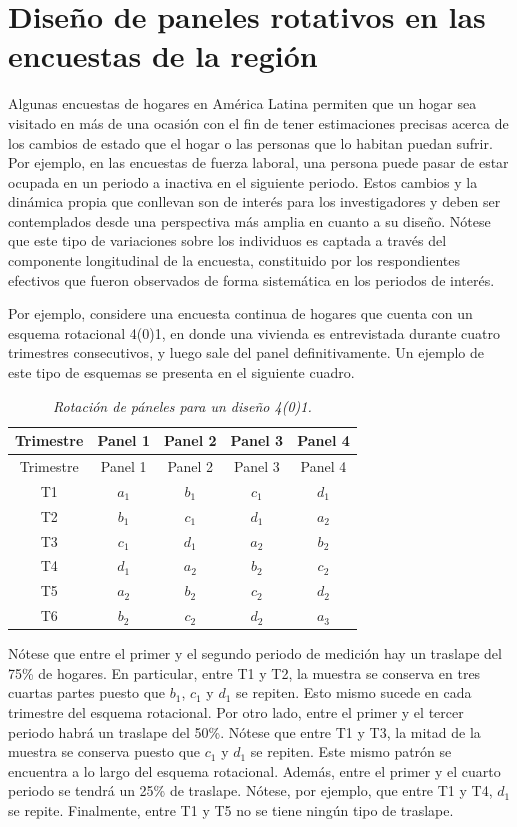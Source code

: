 \documentclass[
  12pt,
  spanish,
]{book}
\begin{document}
\hypertarget{diseuxf1o-de-paneles-rotativos-en-las-encuestas-de-la-regiuxf3n}{%
\section{Diseño de paneles rotativos en las encuestas de la región}\label{diseuxf1o-de-paneles-rotativos-en-las-encuestas-de-la-regiuxf3n}}

Algunas encuestas de hogares en América Latina permiten que un hogar sea visitado en más de una ocasión con el fin de tener estimaciones precisas acerca de los cambios de estado que el hogar o las personas que lo habitan puedan sufrir. Por ejemplo, en las encuestas de fuerza laboral, una persona puede pasar de estar ocupada en un periodo a inactiva en el siguiente periodo. Estos cambios y la dinámica propia que conllevan son de interés para los investigadores y deben ser contemplados desde una perspectiva más amplia en cuanto a su diseño. Nótese que este tipo de variaciones sobre los individuos es captada a través del componente longitudinal de la encuesta, constituido por los respondientes efectivos que fueron observados de forma sistemática en los periodos de interés.

Por ejemplo, considere una encuesta continua de hogares que cuenta con un esquema rotacional 4(0)1, en donde una vivienda es entrevistada durante cuatro trimestres consecutivos, y luego sale del panel definitivamente. Un ejemplo de este tipo de esquemas se presenta en el siguiente cuadro.

\begin{longtable}[]{@{}ccccc@{}}
\caption{\emph{Rotación de páneles para un diseño 4(0)1.}}\tabularnewline
\toprule
Trimestre & Panel 1 & Panel 2 & Panel 3 & Panel 4 \\
\midrule
\endfirsthead
\toprule
Trimestre & Panel 1 & Panel 2 & Panel 3 & Panel 4 \\
\midrule
\endhead
T1 & \(a_1\) & \(b_1\) & \(c_1\) & \(d_1\) \\
T2 & \(b_1\) & \(c_1\) & \(d_1\) & \(a_2\) \\
T3 & \(c_1\) & \(d_1\) & \(a_2\) & \(b_2\) \\
T4 & \(d_1\) & \(a_2\) & \(b_2\) & \(c_2\) \\
T5 & \(a_2\) & \(b_2\) & \(c_2\) & \(d_2\) \\
T6 & \(b_2\) & \(c_2\) & \(d_2\) & \(a_3\) \\
\bottomrule
\end{longtable}

Nótese que entre el primer y el segundo periodo de medición hay un traslape del 75\% de hogares. En particular, entre T1 y T2, la muestra se conserva en tres cuartas partes puesto que \(b_1\), \(c_1\) y \(d_1\) se repiten. Esto mismo sucede en cada trimestre del esquema rotacional. Por otro lado, entre el primer y el tercer periodo habrá un traslape del 50\%. Nótese que entre T1 y T3, la mitad de la muestra se conserva puesto que \(c_1\) y \(d_1\) se repiten. Este mismo patrón se encuentra a lo largo del esquema rotacional. Además, entre el primer y el cuarto periodo se tendrá un 25\% de traslape. Nótese, por ejemplo, que entre T1 y T4, \(d_1\) se repite. Finalmente, entre T1 y T5 no se tiene ningún tipo de traslape.
\end{document}
